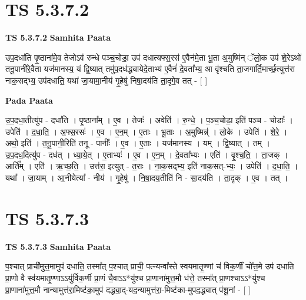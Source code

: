 \documentclass[17pt]{extarticle}
\begin{document}
\section*{ TS 5.3.7.2 }

\textbf{TS 5.3.7.2 } \newline
\textbf{Samhita Paata} \newline

उप॒दधा॑ति पृ॒ष्ठाना॑मे॒व तेजोऽव॑ रुन्धे पञ्च॒चोडा॒ उप॑ दधात्यफ्स॒रस॑ ए॒वैन॑मे॒ता भू॒ता अ॒मुष्मि॑न् ॅलो॒क उप॑ शे॒रेऽथो॑ तनू॒पानी॑रे॒वैता यज॑मानस्य॒ यं द्वि॒ष्यात् तमु॑प॒दध॑द्ध्यायेदे॒ताभ्य॑ ए॒वैनं॑ दे॒वता᳚भ्य॒ आ वृ॑श्चति ता॒जगार्ति॒मार्च्छ॒त्युत्त॑रा नाक॒सद्भ्य॒ उप॑दधाति॒ यथा॑ जा॒यामा॒नीय॑ गृ॒हेषु॑ निषा॒दय॑ति ता॒दृगे॒व तत् - [  ] \newline

\textbf{Pada Paata} \newline

उ॒प॒दधा॒तीत्यु॑प - दधा॑ति । पृ॒ष्ठाना᳚म् । ए॒व । तेजः॑ । अवेति॑ । रु॒न्धे॒ । प॒ञ्च॒चोडा॒ इति॑ पञ्च - चोडाः᳚ । उपेति॑ । द॒धा॒ति॒ । अ॒फ्स॒रसः॑ । ए॒व । ए॒न॒म् । ए॒ताः । भू॒ताः । अ॒मुष्मिन्न्॑ । लो॒के । उपेति॑ । शे॒रे॒ । अथो॒ इति॑ । त॒नू॒पानी॒रिति॑ तनू - पानीः᳚ । ए॒व । ए॒ताः । यज॑मानस्य । यम् । द्वि॒ष्यात् । तम् । उ॒प॒दध॒दित्यु॑प - दध॑त् । ध्या॒ये॒त् । ए॒ताभ्यः॑ । ए॒व । ए॒न॒म् । दे॒वता᳚भ्यः । एति॑ । वृ॒श्च॒ति॒ । ता॒जक् । आर्ति᳚म् । एति॑ । ऋ॒च्छ॒ति॒ । उत्त॑रा॒ इत्युत् - त॒राः । ना॒क॒सद्भ्य॒ इति॑ नाक॒सत्-भ्यः॒ । उपेति॑ । द॒धा॒ति॒ । यथा᳚ । जा॒याम् । आ॒नीयेत्या᳚ - नीय॑ । गृ॒हेषु॑ । नि॒षा॒दय॒तीति॑ नि - सा॒दय॑ति । ता॒दृक् । ए॒व । तत् ।  \newline




\section*{ TS 5.3.7.3 }

\textbf{TS 5.3.7.3 } \newline
\textbf{Samhita Paata} \newline

प॒श्चात् प्राची॑मुत्त॒मामुप॑ दधाति॒ तस्मा᳚त् प॒श्चात् प्राची॒ पत्न्यन्वा᳚स्ते स्वयमातृ॒ण्णां च॑ विक॒र्णीं चो᳚त्त॒मे उप॑ दधाति प्रा॒णो वै स्व॑यमातृ॒ण्णाऽऽयु॑र्विक॒र्णी प्रा॒णं चै॒वाऽऽ*यु॑श्च प्रा॒णाना॑मुत्त॒मौ ध॑त्ते॒ तस्मा᳚त् प्रा॒णश्चाऽऽ*यु॑श्च प्रा॒णाना॑मुत्त॒मौ नान्यामुत्त॑रा॒मिष्ट॑का॒मुप॑ दद्ध्या॒द्-यद॒न्यामुत्त॑रा॒-मिष्ट॑का-मुपद॒द्ध्यात् प॑शू॒नां - [  ] \newline
\end{document}
